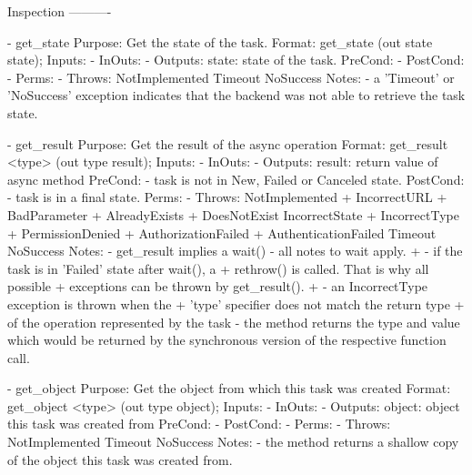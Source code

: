 \begin{myspec}
 
    Inspection
    ----------
 
    - get_state 
      Purpose:  Get the state of the task.
      Format:   get_state            (out state state);
      Inputs:   -
      InOuts:   -
      Outputs:  state:                state of the task.
      PreCond:  -
      PostCond: -
      Perms:    -
      Throws:   NotImplemented
                Timeout
                NoSuccess
      Notes:    - a 'Timeout' or 'NoSuccess' exception indicates
                  that the backend was not able to retrieve the
                  task state.
 
 
    - get_result 
      Purpose:  Get the result of the async operation
      Format:   get_result <type>    (out type result);
      Inputs:   -
      InOuts:   -
      Outputs:  result:               return value of async
                                      method
      PreCond:  - task is not in New, Failed or Canceled state.
      PostCond: - task is in a final state.
      Perms:    -
      Throws:   NotImplemented
+               IncorrectURL
+               BadParameter
+               AlreadyExists
+               DoesNotExist
                IncorrectState
+               IncorrectType
+               PermissionDenied
+               AuthorizationFailed
+               AuthenticationFailed
                Timeout
                NoSuccess
      Notes:    - get_result implies a wait() - all notes to
                  wait apply.
+               - if the task is in 'Failed' state after wait(), a
+                 rethrow() is called.  That is why all possible
+                 exceptions can be thrown by get_result().
+               - an IncorrectType exception is thrown when the 
+                 'type' specifier does not match the return type
+                 of the operation represented by the task
                - the method returns the type and value which
                  would be returned by the synchronous version of
                  the respective function call.
 
 
    - get_object
      Purpose:  Get the object from which this task was created
      Format:   get_object <type>    (out type object);
      Inputs:   -
      InOuts:   -
      Outputs:  object:               object this task was
                                      created from
      PreCond:  -
      PostCond: -
      Perms:    -
      Throws:   NotImplemented
                Timeout
                NoSuccess
      Notes:    - the method returns a shallow copy of the
                  object this task was created from.
 

\end{myspec}
